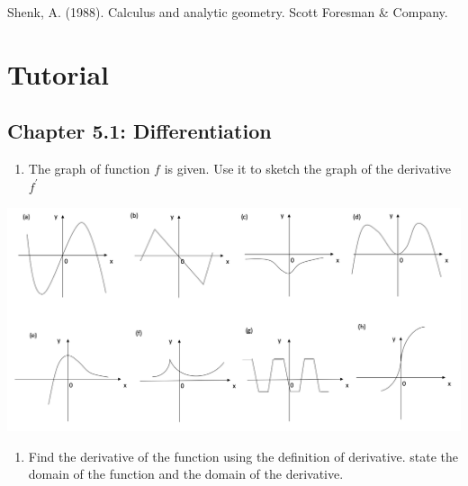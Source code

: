 \documentclass[]{book}
\providecommand{\tightlist}{%
  \setlength{\itemsep}{0pt}\setlength{\parskip}{0pt}}
\begin{document}
Shenk, A. (1988). Calculus and analytic geometry. Scott Foresman \& Company.

\newpage


\hypertarget{tutorial}{%
\section{Tutorial}\label{tutorial}}

\hypertarget{chapter-5.1-differentiation}{%
\subsection*{Chapter 5.1: Differentiation}\label{chapter-5.1-differentiation}}

\begin{enumerate}
\def\labelenumi{\arabic{enumi}.}
\tightlist
\item
  The graph of function \(f\) is given. Use it to sketch the graph of the derivative \(f^\prime\)
\end{enumerate}

\begin{center}\includegraphics[width=1\linewidth]{figure/5Derivatives-8} \end{center}

\begin{enumerate}
\def\labelenumi{\arabic{enumi}.}
\setcounter{enumi}{1}
\tightlist
\item
  Find the derivative of the function using the definition of derivative. state the domain of the function and the domain of the derivative.
\end{enumerate}
\end{document}
